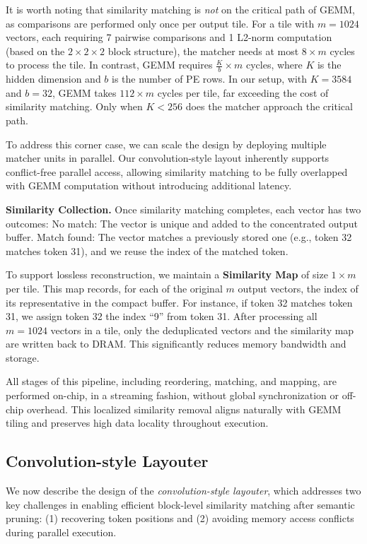 It is worth noting that similarity matching is \textit{not} on the critical path of GEMM, as comparisons are performed only once per output tile.  
For a tile with $m = 1024$ vectors, each requiring 7 pairwise comparisons and 1 L2-norm computation (based on the $2 \times 2 \times 2$ block structure), the matcher needs at most $8 \times m$ cycles to process the tile.  
In contrast, GEMM requires $\frac{K}{b} \times m$ cycles, where $K$ is the hidden dimension and $b$ is the number of PE rows.  
In our setup, with $K = 3584$ and $b = 32$, GEMM takes $112 \times m$ cycles per tile, far exceeding the cost of similarity matching.  
Only when $K < 256$ does the matcher approach the critical path.


To address this corner case, we can scale the design by deploying multiple matcher units in parallel. 
Our convolution-style layout inherently supports conflict-free parallel access, allowing similarity matching to be fully overlapped with GEMM computation without introducing additional latency.

\textbf{Similarity {Collection}.}  
Once similarity matching completes, each vector has two outcomes:  
{No match:} The vector is unique and added to the concentrated output buffer.  
{Match found:} The vector matches a previously stored one (e.g., token 32 matches token 31), and we reuse the index of the matched token.


To support lossless reconstruction, we maintain a \textbf{Similarity Map} of size $1 \times m$ per tile. 
This map records, for each of the original $m$ output vectors, the index of its representative in the compact buffer. 
For instance, if token 32 matches token 31, we assign token 32 the index “9” from token 31.
After processing all $m = 1024$ vectors in a tile, only the deduplicated vectors and the similarity map are written back to DRAM. 
This significantly reduces memory bandwidth and storage.

All stages of this pipeline, including reordering, matching, and mapping, are performed on-chip, in a streaming fashion, without global synchronization or off-chip overhead. 
This localized similarity removal aligns naturally with GEMM tiling and preserves high data locality throughout execution.



\subsection{Convolution-style Layouter}
\label{subsec:layout}
We now describe the design of the \textit{convolution-style layouter}, which addresses two key challenges in enabling efficient block-level similarity matching after semantic pruning: 
(1) recovering token positions and (2) avoiding memory access conflicts during parallel execution.

